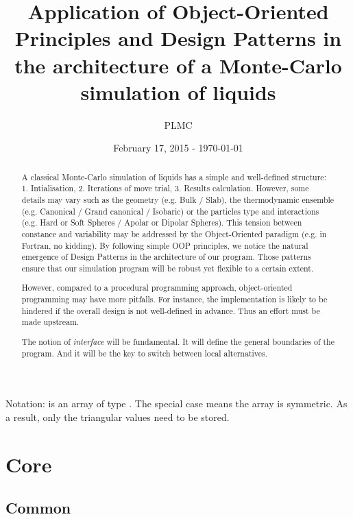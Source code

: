 \documentclass[a4paper, 12pt]{article}
\title{Application of Object-Oriented Principles and Design Patterns in the architecture of
    a Monte-Carlo simulation of liquids}
\author{PLMC}
\date{February 17, 2015 - \today{}}
\def\buildMode{buildmissing}
\begin{document}
    \maketitle

    \begin{abstract}
        A classical Monte-Carlo simulation of liquids has a simple and well-defined structure:
        1. Intialisation, 2. Iterations of move trial, 3. Results calculation.
        However, some details may vary such as the geometry (e.g. Bulk / Slab),
        the thermodynamic ensemble (e.g. Canonical / Grand canonical / Isobaric)
        or the particles type and interactions (e.g. Hard or Soft Spheres /
        Apolar or Dipolar Spheres).
        This tension between constance and variability may be addressed by
        the Object-Oriented paradigm (e.g. in Fortran, no kidding).
        By following simple OOP principles, we notice the natural emergence of Design Patterns
        in the architecture of our program.
        Those patterns ensure that our simulation program will be robust yet flexible
        to a certain extent.

        However, compared to a procedural programming approach, object-oriented programming
        may have more pitfalls.
        For instance, the implementation is likely to be hindered if the overall design is
        not well-defined in advance. Thus an effort must be made upstream.

        The notion of \emph{interface} will be fundamental. It will define the general boundaries of
        the program. And it will be the key to switch between local alternatives.
    \end{abstract}

    Notation:
     is an array of type .
    The special case  means the array is symmetric.
    As a result, only the triangular values need to be stored.

    \newpage
    \tableofcontents
    \clearpage

    \section{Core}

        \subsection{Common}
        \begin{figure}[htb]
            \centering
            
            \caption{}
        \end{figure}
\end{document}
